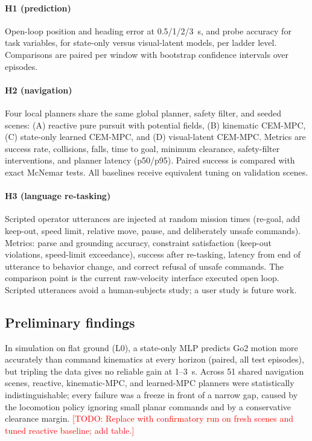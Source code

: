\documentclass[conference]{IEEEtran}
\newcommand{\todo}[1]{\textcolor{red}{[TODO: #1]}}
\begin{document}
\paragraph{H1 (prediction)}
Open-loop position and heading error at 0.5/1/2/3~s, and probe accuracy
for task variables, for state-only versus visual-latent models, per
ladder level. Comparisons are paired per window with bootstrap
confidence intervals over episodes.

\paragraph{H2 (navigation)}
Four local planners share the same global planner, safety filter, and
seeded scenes: (A) reactive pure pursuit with potential fields,
(B) kinematic CEM-MPC, (C) state-only learned CEM-MPC, and
(D) visual-latent CEM-MPC. Metrics are success rate, collisions, falls,
time to goal, minimum clearance, safety-filter interventions, and planner
latency (p50/p95). Paired success is compared with exact McNemar tests.
All baselines receive equivalent tuning on validation scenes.

\paragraph{H3 (language re-tasking)}
Scripted operator utterances are injected at random mission times
(re-goal, add keep-out, speed limit, relative move, pause, and
deliberately unsafe commands). Metrics: parse and grounding accuracy,
constraint satisfaction (keep-out violations, speed-limit exceedance),
success after re-tasking, latency from end of utterance to behavior
change, and correct refusal of unsafe commands. The comparison point is
the current raw-velocity interface executed open loop. Scripted
utterances avoid a human-subjects study; a user study is future work.

\subsection{Preliminary findings}
In simulation on flat ground (L0), a state-only MLP predicts Go2 motion
more accurately than command kinematics at every horizon (paired, all
test episodes), but tripling the data gives no reliable gain at 1--3~s.
Across 51 shared navigation scenes, reactive, kinematic-MPC, and
learned-MPC planners were statistically indistinguishable; every failure
was a freeze in front of a narrow gap, caused by the locomotion policy
ignoring small planar commands and by a conservative clearance margin.
\todo{Replace with confirmatory run on fresh scenes and tuned reactive
baseline; add table.}
\end{document}
